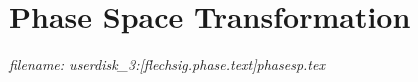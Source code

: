 



\chapter{Phase Space Transformation}   



\tiny{\it filename: userdisk\_3:[flechsig.phase.text]phasesp.tex}     

